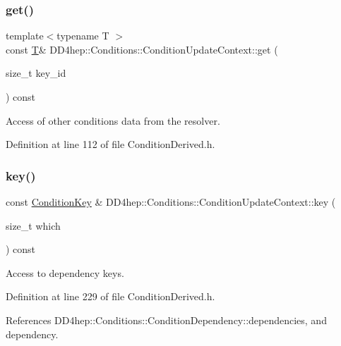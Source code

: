 \subsubsection{\texorpdfstring{get()}{get()}\hspace{0.1cm}{\footnotesize\ttfamily [4/4]}}
{\footnotesize\ttfamily template$<$typename T $>$ \\
const \hyperlink{class_t}{T}\& D\+D4hep\+::\+Conditions\+::\+Condition\+Update\+Context\+::get (\begin{DoxyParamCaption}\item[{size\+\_\+t}]{key\+\_\+id }\end{DoxyParamCaption}) const\hspace{0.3cm}{\ttfamily [inline]}}



Access of other conditions data from the resolver. 



Definition at line 112 of file Condition\+Derived.\+h.

\hypertarget{class_d_d4hep_1_1_conditions_1_1_condition_update_context_a382048ef36f31c77ec8d0b4266277fa9}{}\label{class_d_d4hep_1_1_conditions_1_1_condition_update_context_a382048ef36f31c77ec8d0b4266277fa9} 
\subsubsection{\texorpdfstring{key()}{key()}}
{\footnotesize\ttfamily const \hyperlink{class_d_d4hep_1_1_conditions_1_1_condition_key}{Condition\+Key} \& D\+D4hep\+::\+Conditions\+::\+Condition\+Update\+Context\+::key (\begin{DoxyParamCaption}\item[{size\+\_\+t}]{which }\end{DoxyParamCaption}) const\hspace{0.3cm}{\ttfamily [inline]}}



Access to dependency keys. 



Definition at line 229 of file Condition\+Derived.\+h.



References D\+D4hep\+::\+Conditions\+::\+Condition\+Dependency\+::dependencies, and dependency.



